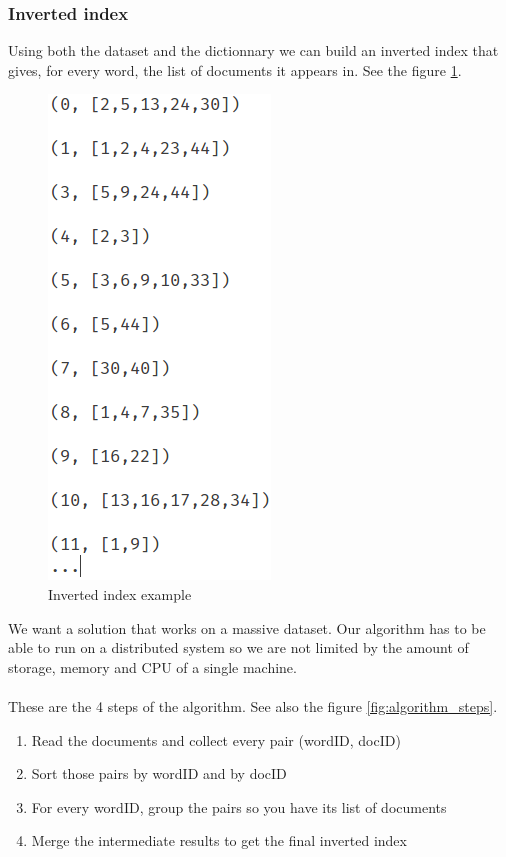 \documentclass[12pt,french,titlepage]{article}
\begin{document}
\subsubsection{Inverted index}
Using both the dataset and the dictionnary we can build an inverted index that gives, for every word, the list of documents it appears in. See the figure \ref{fig:inverted_index}.
\begin{figure}[H]
    \centering
    \includegraphics[scale=0.65]{images/inverted_index}
    \caption{Inverted index example}
    \label{fig:inverted_index}
\end{figure}
We want a solution that works on a massive dataset. Our algorithm has to be able to run on a distributed system so we are not limited by the amount of storage, memory and CPU of a single machine. 
\\\\
These are the 4 steps of the algorithm. See also the figure \ref{fig:algorithm_steps}.
\begin{enumerate}
    \item Read the documents and collect every pair (wordID, docID)
    \item Sort those pairs by wordID and by docID
    \item For every wordID, group the pairs so you have its list of documents
    \item Merge the intermediate results to get the final inverted index
\end{enumerate}
\end{document}

